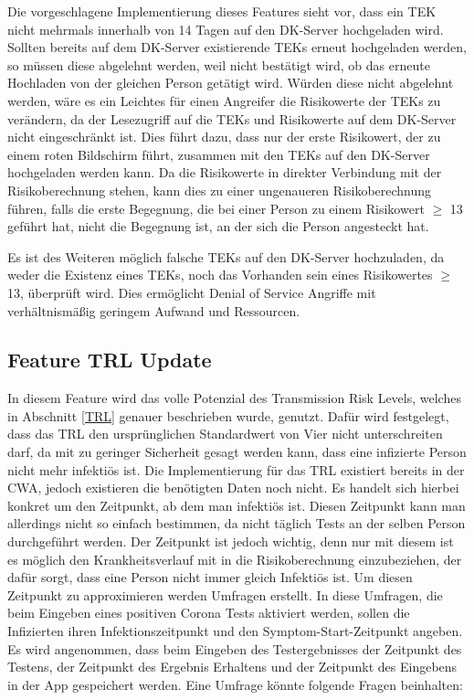 \documentclass[conference,compsoc]{IEEEtran}
\begin{document}
Die vorgeschlagene Implementierung dieses Features sieht vor, dass ein TEK nicht mehrmals innerhalb von 14 Tagen auf den DK-Server hochgeladen wird.
Sollten bereits auf dem DK-Server existierende TEKs erneut hochgeladen werden, so müssen diese abgelehnt werden, weil nicht bestätigt wird, 
ob das erneute Hochladen von der gleichen Person getätigt wird.
Würden diese nicht abgelehnt werden, wäre es ein Leichtes für einen Angreifer die Risikowerte der TEKs zu verändern, 
da der Lesezugriff auf die TEKs und Risikowerte auf dem DK-Server nicht eingeschränkt ist.
Dies führt dazu, dass nur der erste Risikowert, der zu einem roten Bildschirm führt, zusammen mit den TEKs auf den DK-Server hochgeladen werden kann.
Da die Risikowerte in direkter Verbindung mit der Risikoberechnung stehen, kann dies zu einer ungenaueren Risikoberechnung führen, 
falls die erste Begegnung, die bei einer Person zu einem Risikowert $\geq$ 13 geführt hat, nicht die Begegnung ist, an der sich die Person angesteckt hat.

Es ist des Weiteren möglich falsche TEKs auf den DK-Server hochzuladen, 
da weder die Existenz eines TEKs, noch das Vorhanden sein eines Risikowertes $\geq$ 13, überprüft wird.
Dies ermöglicht Denial of Service Angriffe mit verhältnismäßig geringem Aufwand und Ressourcen.\\

\subsection{Feature TRL Update}
\label{Feature TRL Update}
In diesem Feature wird das volle Potenzial des Transmission Risk Levels, welches in Abschnitt \ref{TRL} genauer beschrieben wurde, genutzt. 
Dafür wird festgelegt, dass das TRL den ursprünglichen Standardwert von Vier nicht unterschreiten darf,
da mit zu geringer Sicherheit gesagt werden kann, dass eine infizierte Person nicht mehr infektiös ist. 
Die Implementierung für das TRL existiert bereits in der CWA, jedoch existieren die benötigten Daten noch nicht.
Es handelt sich hierbei konkret um den Zeitpunkt, ab dem man infektiös ist. 
Diesen Zeitpunkt kann man allerdings nicht so einfach bestimmen, da nicht täglich Tests an der selben Person durchgeführt werden.
Der Zeitpunkt ist jedoch wichtig, denn nur mit diesem ist es möglich den Krankheitsverlauf mit in die Risikoberechnung einzubeziehen,
der dafür sorgt, dass eine Person nicht immer gleich Infektiös ist. 
Um diesen Zeitpunkt zu approximieren werden Umfragen erstellt.  
In diese Umfragen, die beim Eingeben eines positiven Corona Tests aktiviert werden, sollen die Infizierten ihren Infektionszeitpunkt und den Symptom-Start-Zeitpunkt angeben. 
Es wird angenommen, dass beim Eingeben des Testergebnisses der Zeitpunkt des Testens, 
der Zeitpunkt des Ergebnis Erhaltens und der Zeitpunkt des Eingebens in der App gespeichert werden. 
Eine Umfrage könnte folgende Fragen beinhalten:
\end{document}

